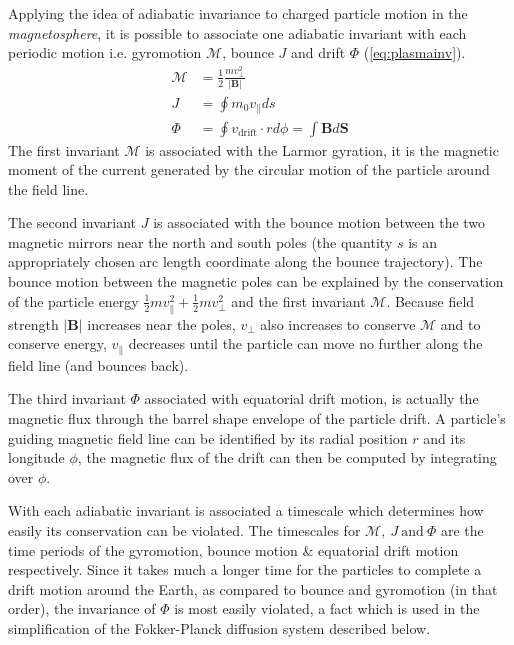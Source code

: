 Applying the idea of adiabatic invariance to charged particle motion in the \emph{magnetosphere}, 
it is possible to associate one adiabatic invariant with each periodic motion i.e. gyromotion 
$\mathcal{M}$, bounce $J$ and drift $\Phi$ (\cref{eq:plasmainv}). 
%
\begin{align}\label{eq:plasmainv}
    \mathcal{M} &= \frac{1}{2}\frac{mv^{2}_{\perp}}{\rvert \mathbf{B} \rvert} \\
    J &= \oint{m_0 v_{\parallel}ds} \\
    \Phi &= \oint{v_{\text{drift}} \cdot r d\phi} = \int{\mathbf{B} d\mathbf{S}}
\end{align}
%
The first invariant $\mathcal{M}$ is associated with the Larmor gyration, it is the magnetic moment 
of the current generated by the circular motion of the particle around the field line. 

The second invariant $J$ is associated with the bounce motion between the two magnetic mirrors near 
the north and south poles (the quantity $s$ is an appropriately chosen arc length coordinate along 
the bounce trajectory). The bounce motion between the magnetic poles can be explained by the 
conservation of the particle energy $\frac{1}{2}m v^2_{\parallel} + \frac{1}{2}m v^{2}_{\perp}$ and 
the first invariant $\mathcal{M}$. Because field strength $\rvert \mathbf{B} \rvert$ increases 
near the poles, $v_{\perp}$ also increases to conserve $\mathcal{M}$ and to conserve energy, 
$v_{\parallel}$ decreases until the particle can move no further along the field line (and 
bounces back).

The third invariant $\Phi$ associated with equatorial drift motion, is actually the magnetic 
flux through the barrel shape envelope of the particle drift. A particle's guiding magnetic field 
line can be identified by its radial position $r$ and its longitude $\phi$, the magnetic flux of 
the drift can then be computed by integrating over $\phi$.

With each adiabatic invariant is associated a timescale which determines how easily its 
conservation can be violated. The timescales for $\mathcal{M},\ J \ \text{and} \ \Phi$ are the 
time periods of the gyromotion, bounce motion \& equatorial drift motion respectively. Since 
it takes much a longer time for the particles to complete a drift motion around the Earth, as 
compared to bounce and gyromotion (in that order), the invariance of $\Phi$ is most easily 
violated, a fact which is used in the simplification of the Fokker-Planck diffusion system 
described below.    

